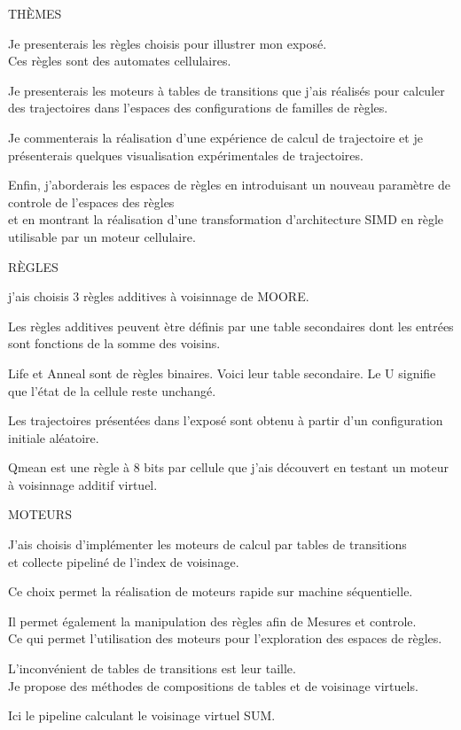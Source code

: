 \documentclass[a4paper]{slides}
\newcommand{\mytitle}[1]{\begin{center}\begin{large}#1\end{large}\end{center}}
\begin{document}
\begin{slide}
  \mytitle{TH\`EMES}
  Je presenterais les r\`egles choisis pour illustrer mon expos\'e.\\
  Ces r\`egles sont des automates cellulaires.

  Je presenterais les moteurs \`a tables de transitions que j'ais r\'ealis\'es pour
  calculer des trajectoires dans l'espaces des configurations de
  familles de r\`egles.
  
  Je commenterais la r\'ealisation d'une ex\-p\'e\-ri\-ence de calcul de trajectoire
  et je pr\'esenterais quelques visualisation exp\'erimentales de
  trajectoires.
  
  Enfin, j'aborderais les espaces de r\`egles
  en introduisant un nouveau param\`etre de controle de l'espaces des
  r\`egles\\
  et en montrant la r\'ealisation d'une transformation d'architecture
  SIMD en r\`egle utilisable par un moteur cellulaire.
\end{slide}

\begin{slide}
  \mytitle{R\`EGLES}
  j'ais choisis 3 r\`egles additives \`a voisinnage de MOORE.
  
  Les r\`egles additives peuvent \`etre d\'efinis par une table secondaires
  dont les entr\'ees sont fonctions de la somme des voisins.
  
  Life et Anneal sont de r\`egles binaires.
  Voici leur table secondaire.
  Le U signifie que l'\'etat de la cellule reste unchang\'e.
  
  Les trajectoires pr\'esent\'ees dans l'expos\'e sont obtenu \`a partir d'un
  configuration initiale al\'eatoire.
  
  Qmean est une r\`egle \`a 8 bits par cellule que j'ais d\'ecouvert en
  testant un moteur \`a voisinnage additif virtuel.
\end{slide}

\begin{slide}
  \mytitle{MOTEURS}
  J'ais choisis d'impl\'ementer les moteurs de calcul par tables de
  transitions\\
  et collecte pipelin\'e de l'index de voisinage.
  
  Ce choix permet la r\'ealisation de moteurs rapide sur machine
  s\'equentielle.
  
  Il permet \'egalement la manipulation des r\`egles afin de Mesures et
  controle.\\
  Ce qui permet l'utilisation des moteurs pour l'exploration des espaces
  de r\`egles.
  
  L'inconv\'enient de tables de transitions est leur taille.\\
  Je propose des m\'ethodes de compositions de tables et de voisinage
  virtuels.
  
  Ici le pipeline calculant le voisinage virtuel SUM.
\end{slide}
\end{document}
